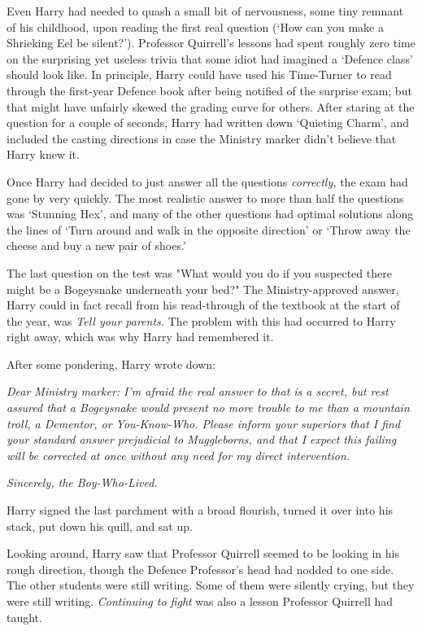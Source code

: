 Even Harry had needed to quash a small bit of nervousness, some tiny remnant of
his childhood, upon reading the first real question (‘How can you make a
Shrieking Eel be silent?’). Professor Quirrell’s lessons had spent roughly zero
time on the surprising yet useless trivia that some idiot had imagined a
‘Defence class’ should look like. In principle, Harry could have used his
Time-Turner to read through the first-year Defence book after being notified of
the surprise exam; but that might have unfairly skewed the grading curve for
others. After staring at the question for a couple of seconds, Harry had
written down ‘Quieting Charm’, and included the casting directions in case the
Ministry marker didn’t believe that Harry knew it.

Once Harry had decided to just answer all the questions \emph{correctly,} the
exam had gone by very quickly. The most realistic answer to more than half the
questions was ‘Stunning Hex’, and many of the other questions had optimal
solutions along the lines of ‘Turn around and walk in the opposite direction’
or ‘Throw away the cheese and buy a new pair of shoes.’

The last question on the test was "What would you do if you suspected there
might be a Bogeysnake underneath your bed?" The Ministry-approved answer, Harry
could in fact recall from his read-through of the textbook at the start of the
year, was \emph{Tell your parents.} The problem with this had occurred to Harry
right away, which was why Harry had remembered it.

After some pondering, Harry wrote down:

\emph{Dear Ministry marker: I’m afraid the real answer to that is a secret, but
rest assured that a Bogeysnake would present no more trouble to me than a
mountain troll, a Dementor, or You-Know-Who. Please inform your superiors that
I find your standard answer prejudicial to Muggleborns, and that I expect this
failing will be corrected at once without any need for my direct intervention.}

\emph{Sincerely, the Boy-Who-Lived.}

Harry signed the last parchment with a broad flourish, turned it over into his
stack, put down his quill, and sat up.

Looking around, Harry saw that Professor Quirrell seemed to be looking in his
rough direction, though the Defence Professor’s head had nodded to one side.
The other students were still writing. Some of them were silently crying, but
they were still writing. \emph{Continuing to fight} was also a lesson Professor
Quirrell had taught.

